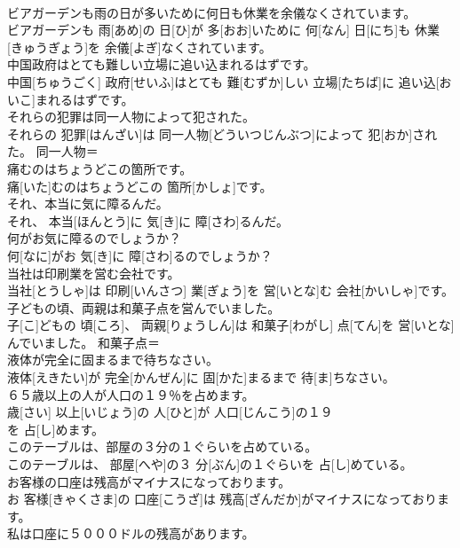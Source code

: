 \documentclass[8pt]{extreport}
\begin{document}
\begin{CJK}{UTF8}{min}
\\	ビアガーデンも雨の日が多いために何日も休業を余儀なくされています。	
\\	ビアガーデンも 雨[あめ]の 日[ひ]が 多[おお]いために 何[なん] 日[にち]も 休業[きゅうぎょう]を 余儀[よぎ]なくされています。	
\\	中国政府はとても難しい立場に追い込まれるはずです。	
\\	中国[ちゅうごく] 政府[せいふ]はとても 難[むずか]しい 立場[たちば]に 追い込[おいこ]まれるはずです。	
\\	それらの犯罪は同一人物によって犯された。	
\\	それらの 犯罪[はんざい]は 同一人物[どういつじんぶつ]によって 犯[おか]された。	同一人物＝ 
\\	痛むのはちょうどこの箇所です。	
\\	痛[いた]むのはちょうどこの 箇所[かしょ]です。	
\\	それ、本当に気に障るんだ。	
\\	それ、 本当[ほんとう]に 気[き]に 障[さわ]るんだ。	
\\	何がお気に障るのでしょうか？	
\\	何[なに]がお 気[き]に 障[さわ]るのでしょうか？	
\\	当社は印刷業を営む会社です。	
\\	当社[とうしゃ]は 印刷[いんさつ] 業[ぎょう]を 営[いとな]む 会社[かいしゃ]です。	
\\	子どもの頃、両親は和菓子点を営んでいました。	
\\	子[こ]どもの 頃[ころ]、 両親[りょうしん]は 和菓子[わがし] 点[てん]を 営[いとな]んでいました。	和菓子点＝
\\	液体が完全に固まるまで待ちなさい。	
\\	液体[えきたい]が 完全[かんぜん]に 固[かた]まるまで 待[ま]ちなさい。	
\\	６５歳以上の人が人口の１９％を占めます。	
\\	歳[さい] 以上[いじょう]の 人[ひと]が 人口[じんこう]の１９ 
\\	[ぱーせんと]を 占[し]めます。	
\\	このテーブルは、部屋の３分の１ぐらいを占めている。	
\\	このテーブルは、 部屋[へや]の３ 分[ぶん]の１ぐらいを 占[し]めている。	
\\	お客様の口座は残高がマイナスになっております。	
\\	お 客様[きゃくさま]の 口座[こうざ]は 残高[ざんだか]がマイナスになっております。	
\\	私は口座に５０００ドルの残高があります。	

\end{CJK}
\end{document}
